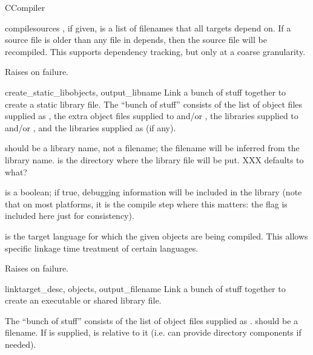\documentclass{manual}
\begin{document}
\begin{classdesc}{CCompiler}{}
\begin{methoddesc}{compile}{sources}
, if given, is a list of filenames that all targets
depend on.  If a source file is older than any file in
depends, then the source file will be recompiled.  This
supports dependency tracking, but only at a coarse
granularity.

Raises  on failure.
\end{methoddesc}

\begin{methoddesc}{create_static_lib}{objects, output_libname}
Link a bunch of stuff together to create a static library file.
The ``bunch of stuff'' consists of the list of object files supplied
as , the extra object files supplied to
 and/or , the libraries
supplied to  and/or , and the
libraries supplied as  (if any).

 should be a library name, not a filename; the
filename will be inferred from the library name.   is
the directory where the library file will be put. XXX defaults to what?

 is a boolean; if true, debugging information will be
included in the library (note that on most platforms, it is the
compile step where this matters: the  flag is included here
just for consistency).

 is the target language for which the given objects
are being compiled. This allows specific linkage time treatment of
certain languages.

Raises  on failure.
\end{methoddesc}

\begin{methoddesc}{link}{target_desc, objects, output_filename}
Link a bunch of stuff together to create an executable or
shared library file.

The ``bunch of stuff'' consists of the list of object files supplied
as .   should be a filename.  If
 is supplied,  is relative to it
(i.e.  can provide directory components if
needed).


\end{methoddesc}
\end{classdesc}
\end{document}
